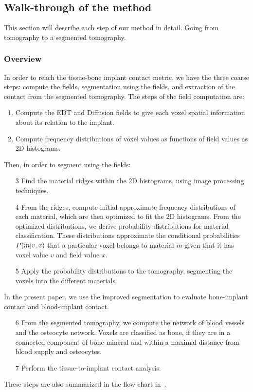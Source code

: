 
\subsection{Walk-through of the method}
This section will describe each step of our method in detail. Going from tomography to a segmented tomography.

\subsubsection{Overview}
In order to reach the tissue-bone implant contact metric, we have the three coarse steps: compute the fields, segmentation using the fields, and extraction of the contact from the segmented tomography.
%
The steps of the field computation are:
\begin{enumerate}
    \item Compute the EDT and Diffusion fields to give each voxel spatial information about its relation to the implant.
    \item Compute frequency distributions of voxel values as functions of field values as 2D histograms.
\end{enumerate}
%    
Then, in order to segment using the fields:
\begin{enumerate}
    \item[3] Find the material ridges within the 2D histograms, using image processing techniques.
    \item[4] From the ridges, compute initial approximate frequency distributions of each material, which are then optimized to fit the 2D histograms.
          From the optimized distributions, we derive probability distributions for material classification. These distributions approximate the conditional probabilities $P\!\left(m\middle\vert v,x\right)$ that a particular voxel belongs to material $m$ given that it has voxel value $v$ and field value $x$.
    \item[5] Apply the probability distributions to the tomography, segmenting the voxels into the different materials.
\end{enumerate}
%   
In the present paper, we use the improved segmentation to evaluate bone-implant contact and blood-implant contact.
\begin{enumerate}
\item[6] From the segmented tomography, we compute the network of blood vessels and the osteocyte network. Voxels are classified as bone, if they are in a connected component of bone-mineral and within a maximal distance from blood supply and osteocytes.
\item[7] Perform the tissue-to-implant contact analysis.
\end{enumerate}
%
These steps are also summarized in the flow chart in~.

